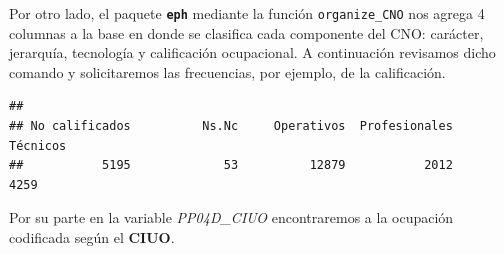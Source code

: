 \documentclass[
]{book}
\newenvironment{Shaded}{\begin{snugshade}}{\end{snugshade}}
\newcommand{\AttributeTok}[1]{\textcolor[rgb]{0.77,0.63,0.00}{#1}}
\newcommand{\FunctionTok}[1]{\textcolor[rgb]{0.00,0.00,0.00}{#1}}
\newcommand{\NormalTok}[1]{#1}
\newcommand{\OtherTok}[1]{\textcolor[rgb]{0.56,0.35,0.01}{#1}}
\newcommand{\SpecialCharTok}[1]{\textcolor[rgb]{0.00,0.00,0.00}{#1}}
\begin{document}
Por otro lado, el paquete \textbf{\texttt{eph}} mediante la función \texttt{organize\_CNO} nos agrega 4 columnas a la base en donde se clasifica cada componente del CNO: carácter, jerarquía, tecnología y calificación ocupacional. A continuación revisamos dicho comando y solicitaremos las frecuencias, por ejemplo, de la calificación.

\begin{Shaded}
\end{Shaded}

\begin{verbatim}
## 
## No calificados          Ns.Nc     Operativos  Profesionales       Técnicos 
##           5195             53          12879           2012           4259
\end{verbatim}

Por su parte en la variable \emph{PP04D\_CIUO} encontraremos a la ocupación codificada según el \textbf{CIUO}.

\begin{Shaded}
\end{Shaded}
\end{document}
